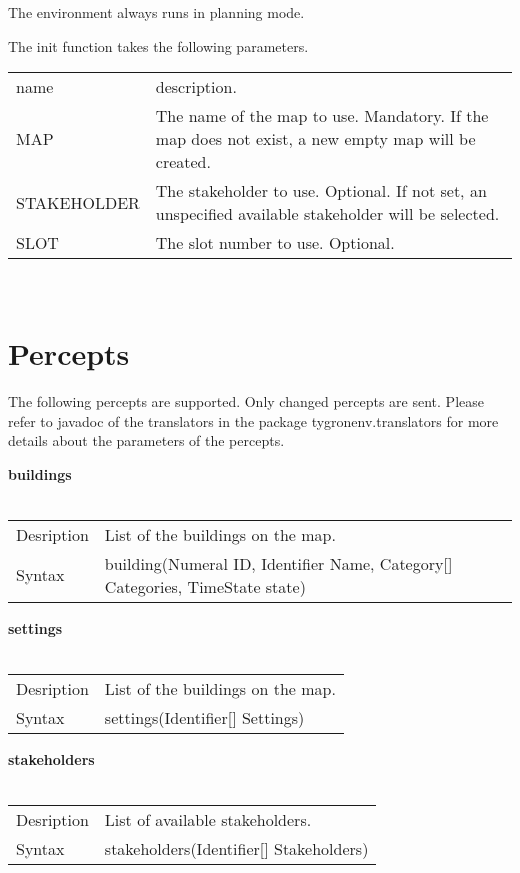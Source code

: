 \documentclass[english,11pt]{article}
\begin{document}
The environment always runs in planning mode.

The init function takes the following parameters. 

\begin{tabularx}{\textwidth}{lX}
 name & description. \\
 MAP & The name of the map to use.  Mandatory. If the map does not exist, a new empty map will be created. \\
 STAKEHOLDER & The stakeholder to use. Optional. If not set, an unspecified available stakeholder will be selected. \\
 SLOT &  The slot number to use.  Optional.  \\
\end{tabularx}\\


\section{Percepts}

The following percepts are supported. Only changed percepts are sent. Please refer to javadoc of the translators in the package tygronenv.translators for more details about the parameters of the percepts.
\newline


\textbf{buildings}\\
\\
\begin{tabularx}{\textwidth}{lX}
 Desription & List of the buildings on the map. \\
 Syntax & building(Numeral ID, Identifier Name, Category[] Categories, TimeState state) \\
\end{tabularx}
\newline

\textbf{settings}\\
\\
\begin{tabularx}{\textwidth}{lX}
 Desription & List of the buildings on the map. \\
 Syntax & settings(Identifier[] Settings) \\
\end{tabularx}
\newline

\textbf{stakeholders}\\
\\
\begin{tabularx}{\textwidth}{lX}
 Desription & List of available stakeholders. \\
 Syntax & stakeholders(Identifier[] Stakeholders) \\
\end{tabularx}
\newline
\end{document}
